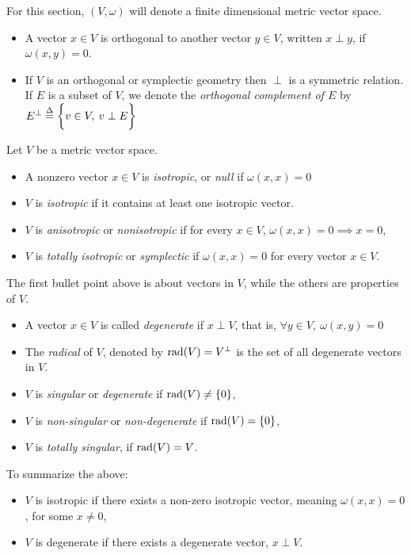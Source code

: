 \documentclass[../main-v2-manifolds.tex]{subfiles}
\begin{document}
    For this section, $(V,\omega)$ will denote a finite dimensional metric vector space.
    \begin{itemize}
        \item A vector $x\in V$ is orthogonal to another vector $y\in V$, written $x\perp y$, if $\omega(x,y)=0$.
        \item If $V$ is an orthogonal or symplectic geometry then $\perp$ is a symmetric relation. If $E$ is a subset of $V$, we denote the \emph{orthogonal complement of $E$} by $E^\perp \overset{\Delta}{=} \biggl\{{v\in V,\: v\perp E}\biggr\}$
    \end{itemize}
    
    Let $V$ be a metric vector space. 
        \begin{itemize}
            \item A nonzero vector $x\in V$ is \emph{isotropic}, or \emph{null} if $\omega(x,x)=0$
            \item $V$ is \emph{isotropic} if it contains at least one isotropic vector.
            \item $V$ is \emph{anisotropic} or \emph{nonisotropic} if for every $x\in V$, $\omega(x,x)=0\implies x=0$,
            \item $V$ is \emph{totally isotropic} or \emph{symplectic} if $\omega(x,x)=0$ for every vector $x\in V$. 
        \end{itemize}
            The first bullet point above is about vectors in $V$, while the others are properties of $V$.
        \begin{itemize}
            \item A vector $x\in V$ is called \emph{degenerate} if $x\perp V$, that is, $\forall y\in V,\: \omega(x,y)=0$
            \item The \emph{radical} of $V$, denoted by $\operatorname{rad}({V})=V^\perp$ is the set of all degenerate vectors in $V$.
            \item $V$ is \emph{singular} or \emph{degenerate} if $\operatorname{rad}({V})\neq \{0\}$,
            \item $V$ is \emph{non-singular} or \emph{non-degenerate} if $\operatorname{rad}({V}) = \{0\}$,
            \item $V$ is \emph{totally singular}, if $\operatorname{rad}({V}) = V$. 
        \end{itemize}
        To summarize the above:
        \begin{itemize}
            \item $V$ is isotropic if there exists a non-zero isotropic vector, meaning $\omega(x,x)=0$, for some $x\neq 0$,
            \item $V$ is degenerate if there exists a degenerate vector, $x\perp V$.
        \end{itemize}
\end{document}
